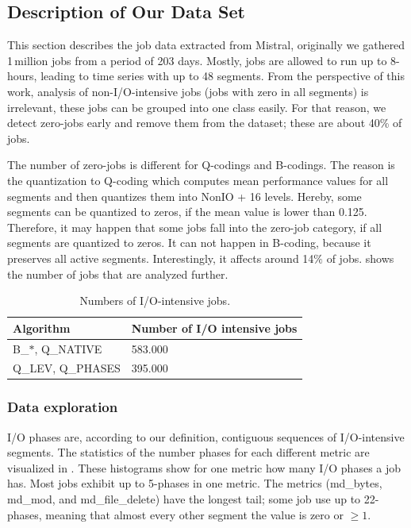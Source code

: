 \documentclass{jhps}
\begin{document}
\subsection{Description of Our Data Set}
This section describes the job data extracted from Mistral, originally we gathered 1\,million jobs from a period of 203 days.
Mostly, jobs are allowed to run up to 8-hours, leading to time series with up to 48 segments.
From the perspective of this work, analysis of non-I/O-intensive jobs (jobs with zero in all segments) is irrelevant, these jobs can be grouped into one class easily.
For that reason, we detect zero-jobs early and remove them from the dataset; these are about 40\% of jobs.

The number of zero-jobs is different for Q-codings and B-codings.
The reason is the quantization to Q-coding which computes mean performance values for all segments and then quantizes them into NonIO + 16 levels.
Hereby, some segments can be quantized to zeros, if the mean value is lower than 0.125.
Therefore, it may happen that some jobs fall into the zero-job category, if all segments are quantized to zeros.
It can not happen in B-coding, because it preserves all active segments.
Interestingly, it affects around 14$\%$ of jobs.
 shows the number of jobs that are analyzed further.

\begin{table}
  \centering
  \begin{tabular}{ll}
    Algorithm & Number of I/O intensive jobs \\
    \midrule
    B\_$\ast$, Q\_NATIVE &  583.000 \\
    Q\_LEV, Q\_PHASES &  395.000 \\
  \end{tabular}
  \caption{Numbers of I/O-intensive jobs.}
  \label{tab:n_intensive_jobs}
\end{table}


\subsubsection{Data exploration}
I/O phases are, according to our definition, contiguous sequences of I/O-intensive segments.
The statistics of the number phases for each different metric are visualized in .
These histograms show for one metric how many I/O phases a job has.
Most jobs exhibit up to 5-phases in one metric.
The metrics (md\_bytes, md\_mod, and md\_file\_delete) have the longest tail; some job use up to 22-phases, meaning that almost every other segment the value is zero or $\geq 1$.
\end{document}
